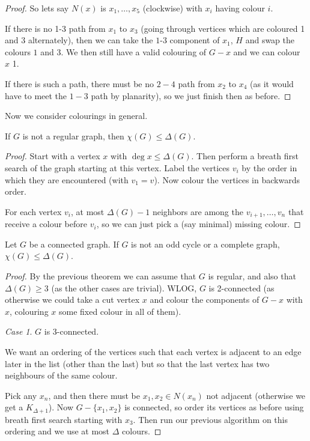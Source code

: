 \documentclass[a3paper, 10pt]{article}
\begin{document}
\begin{multicols*}{5}
\begin{proof}
So lets say $N(x)$ is $x_1, \dots, x_5$ (clockwise) with $x_i$ having colour $i$. 

If there is no 1-3 path from $x_1$ to $x_3$ (going through vertices which are coloured 1 and 3 alternately), then we can take the $1$-$3$ component of $x_1$, $H$ and swap the colours $1$ and $3$. We then still have a valid colouring of $G -x$ and we can colour $x$ 1.

If there is such a path, there must be no $2-4$ path from $x_2$ to $x_4$ (as it would have to meet the $1-3$ path by planarity), so we just finish then as before.
\end{proof}

Now we consider colourings in general.

\begin{theorem}
    If $G$ is not a regular graph, then $\chi(G) \leq \Delta(G)$.
\end{theorem}
\begin{proof}
    Start with a vertex $x$ with $\deg x \leq \Delta(G)$. Then perform a breath first search of the graph starting at this vertex. Label the vertices $v_i$ by the order in which they are encountered (with $v_1 = v$). Now colour the vertices in backwards order.

    For each vertex $v_i$, at most $\Delta(G) - 1$ neighbors are among the $v_{i + 1}, \dots, v_n$ that receive a colour before $v_i$, so we can just pick a (say minimal) missing colour. 
\end{proof}

\begin{theorem}[Brooks]
    Let $G$ be a connected graph. If $G$ is not an odd cycle or a complete graph, $\chi(G) \leq \Delta(G)$.
\end{theorem}
\begin{proof}
    By the previous theorem we can assume that $G$ is regular, and also that $\Delta(G) \geq 3$ (as the other cases are trivial). 
    WLOG, $G$ is 2-connected (as otherwise we could take a cut vertex $x$ and colour the components of $G - x$ with $x$, colouring $x$ some fixed colour in all of them). 

    \emph{Case 1}. $G$ is 3-connected.

    We want an ordering of the vertices such that each vertex is adjacent to an edge later in the list (other than the last) but so that the last vertex has two neighbours of the same colour.

    Pick any $x_n$, and then there must be $x_1, x_2 \in N(x_n)$ not adjacent (otherwise we get a $K_{\Delta + 1}$). Now $G - \{x_1, x_2\}$ is connected, so order its vertices as before using breath first search starting with $x_3$. Then run our previous algorithm on this ordering and we use at most $\Delta$ colours.


\end{proof}
\end{multicols*}
\end{document}
